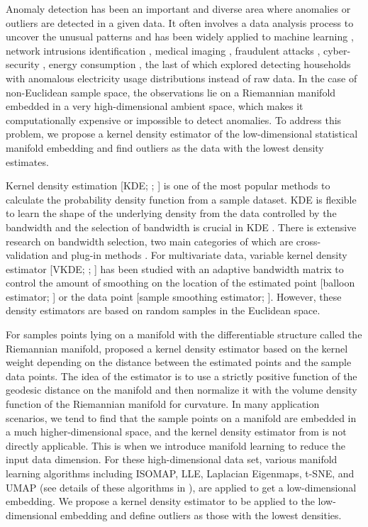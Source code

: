 \documentclass[11pt,a4paper,]{article}
\begin{document}
Anomaly detection has been an important and diverse area where anomalies or outliers are detected in a given data. It often involves a data analysis process to uncover the unusual patterns and has been widely applied to machine learning \autocite{Omar2013-lz}, network intrusions identification \autocite{Ahmed2016-co,Bhuyan2013-ra}, medical imaging \autocite{Fernando2022-ef}, fraudulent attacks \autocite{Ahmed2016-dz}, cyber-security \autocite{Ten2011-co}, energy consumption \autocite{Cheng2021-ex}, the last of which explored detecting households with anomalous electricity usage distributions instead of raw data. In the case of non-Euclidean sample space, the observations lie on a Riemannian manifold embedded in a very high-dimensional ambient space, which makes it computationally expensive or impossible to detect anomalies. To address this problem, we propose a kernel density estimator of the low-dimensional statistical manifold embedding and find outliers as the data with the lowest density estimates.

Kernel density estimation {[}KDE; \textcite{Parzen1962-gt}; \textcite{Chen2017-dw}{]} is one of the most popular methods to calculate the probability density function from a sample dataset. KDE is flexible to learn the shape of the underlying density from the data controlled by the bandwidth and the selection of bandwidth is crucial in KDE \autocite{Jones1990-oe,Terrell1992-ut}. There is extensive research on bandwidth selection, two main categories of which are cross-validation \autocite{Jones1992-ta,Sain1994-gr} and plug-in methods \autocite{Wand1994-gc,Duong2003-sp}. For multivariate data, variable kernel density estimator {[}VKDE; \textcite{Jones1990-oe}; \textcite{Terrell1992-ut}{]} has been studied with an adaptive bandwidth matrix to control the amount of smoothing on the location of the estimated point {[}balloon estimator; \textcite{Terrell1992-ut}{]} or the data point {[}sample smoothing estimator; \textcite{Terrell1992-ut}{]}. However, these density estimators are based on random samples in the Euclidean space.

For samples points lying on a manifold with the differentiable structure called the Riemannian manifold, \textcite{Pelletier2005-vu} proposed a kernel density estimator based on the kernel weight depending on the distance between the estimated points and the sample data points. The idea of the estimator is to use a strictly positive function of the geodesic distance on the manifold and then normalize it with the volume density function of the Riemannian manifold for curvature. \autocite{Henry2009-ll} In many application scenarios, we tend to find that the sample points on a manifold are embedded in a much higher-dimensional space, and the kernel density estimator from \textcite{Pelletier2005-vu} is not directly applicable.
This is when we introduce manifold learning to reduce the input data dimension. For these high-dimensional data set, various manifold learning algorithms including ISOMAP, LLE, Laplacian Eigenmaps, t-SNE, and UMAP (see details of these algorithms in \textcite{Cheng2021-ex}), are applied to get a low-dimensional embedding. We propose a kernel density estimator to be applied to the low-dimensional embedding and define outliers as those with the lowest densities.
\end{document}

